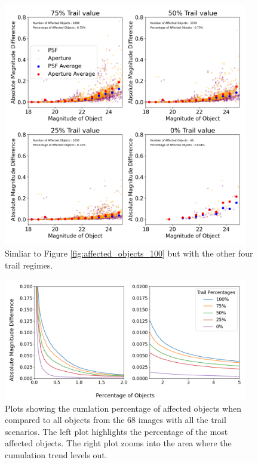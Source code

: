 \documentclass[DM,authoryear,toc]{lsstdoc}
\begin{document}
\begin{figure}[!htp]
  \centering
  \includegraphics[width=0.95\textwidth, angle=0]{Trail_75_0.png}
  \caption{
  Simliar to Figure \ref{fig:affected_objects_100} but with the other four trail regimes.
  }\label{fig:affected_objects_other}
\end{figure}

\begin{figure}[!htp]
  \centering
  \includegraphics[width=0.95\textwidth, angle=0]{Cumlative_Persistence_Plot.png}
  \caption{
  Plots showing the cumlation percentage of affected objects when compared to all objects from the 68 images with all the trail scenarios. 
  The left plot highlights the percentage of the most affected objects. 
  The right plot zooms into the area where the cumulation trend levels out.
  }\label{fig:cuml}
\end{figure}
\end{document}
